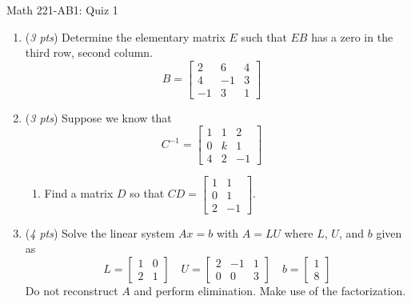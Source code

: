 \documentclass[11pt]{article}
\begin{document}
\begin{center}
\Large
\rm{Math 221-AB1:  Quiz 1}
\\
\end{center}
\vspace{0.1in}
\begin{enumerate}
\item{(\emph{3 pts}) Determine the elementary matrix $E$ such that $EB$ has a zero in the third row, second column. 
	\begin{displaymath}
	B = \left[ \begin{array}{rrr} 2 &  6 & 4 \\ 4 & -1 & 3 \\ -1 & 3 & 1 \end{array} \right] \quad
	\end{displaymath}
}

\vspace{1.5in}


\item{(\emph{3 pts}) Suppose we know that 
\begin{displaymath}
C^{-1} = \left[ \begin{array}{rrr} 1 &  1 & 2 \\ 0 & k & 1 \\ 4 & 2 & -1 \end{array} \right] \quad
\end{displaymath}
\begin{enumerate}
\item{Find a matrix $D$ so that $CD= \left[ \begin{array}{rr} 1 &  1 \\ 0 &  1 \\  2 & -1 \end{array} \right] $.}
\end{enumerate}

}

\vspace{1.5in}

\item{(\emph{4 pts}) Solve the linear system $Ax=b$ with $A=LU$ where $L$, $U$, and $b$ given as 
\begin{displaymath}
L = \left[ \begin{array}{rr} 1 &  0 \\ 2 & 1 \end{array} \right] \quad 
U = \left[ \begin{array}{rrr} 2 &  -1 & 1 \\ 0 & 0 & 3 \end{array} \right] \quad 
b = \left[ \begin{array}{r} 1  \\ 8 \end{array} \right]
\end{displaymath}
Do not reconstruct $A$  and perform elimination. Make use of the factorization.
}



\end{enumerate}

\vspace{0.1in}
\end{document}
